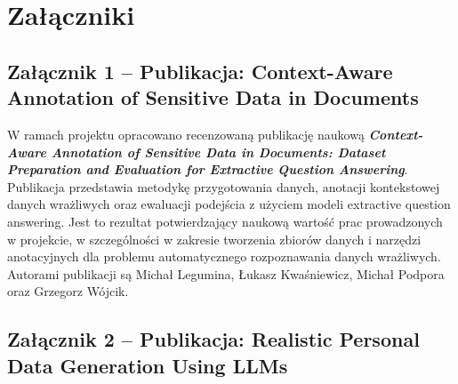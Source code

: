 \documentclass[12pt,a4paper]{report}
\begin{document}


{}
\nocite{legumina2025contextawareannotation}
\nocite{legumina2025realisticpersonaldata}




\appendix

\chapter*{Załączniki}

\section*{Załącznik 1 -- Publikacja: Context-Aware Annotation of Sensitive Data in Documents}

W ramach projektu opracowano recenzowaną publikację naukową \textit{\textbf{Context-Aware Annotation of Sensitive Data in Documents: Dataset Preparation and Evaluation for Extractive Question Answering}}. Publikacja przedstawia metodykę przygotowania danych, anotacji kontekstowej danych wrażliwych oraz ewaluacji podejścia z użyciem modeli extractive question answering. Jest to rezultat potwierdzający naukową wartość prac prowadzonych w projekcie, w szczególności w zakresie tworzenia zbiorów danych i narzędzi anotacyjnych dla problemu automatycznego rozpoznawania danych wrażliwych. Autorami publikacji są Michał Legumina, Łukasz Kwaśniewicz, Michał Podpora oraz Grzegorz Wójcik.



\section*{Załącznik 2 -- Publikacja: Realistic Personal Data Generation Using LLMs}
\end{document}
